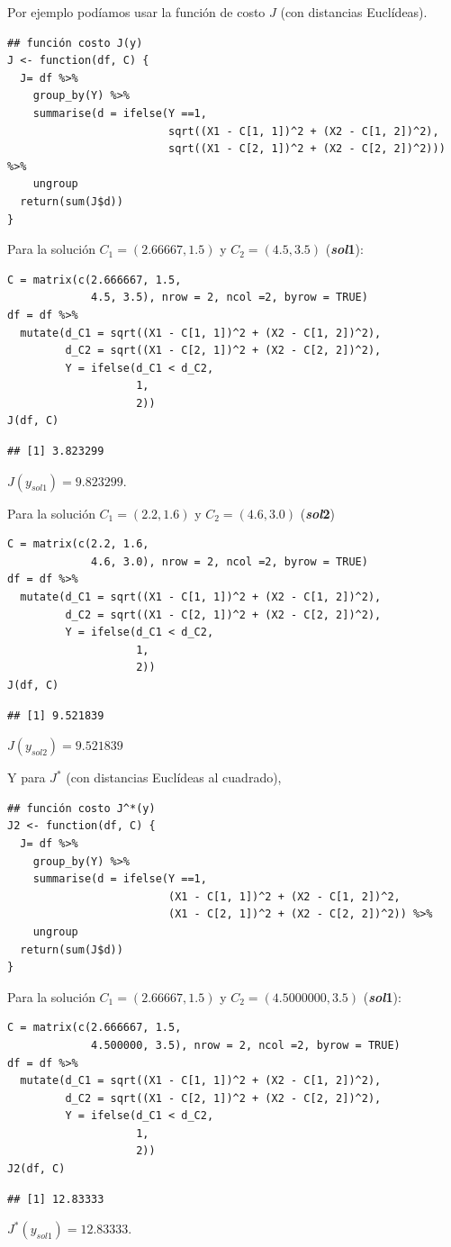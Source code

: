 Por ejemplo podíamos usar la función de costo $J$ (con distancias Euclídeas).
\begin{lstlisting}
## función costo J(y)
J <- function(df, C) {
  J= df %>%
    group_by(Y) %>%
    summarise(d = ifelse(Y ==1, 
                         sqrt((X1 - C[1, 1])^2 + (X2 - C[1, 2])^2),
                         sqrt((X1 - C[2, 1])^2 + (X2 - C[2, 2])^2))) %>%
    ungroup
  return(sum(J$d))
}
\end{lstlisting}
Para la solución $C_1=(2.66667,1.5)$ y $C_2=(4.5,3.5)$ (\textbf{\textit{sol}1}):
\begin{lstlisting}
C = matrix(c(2.666667, 1.5,
             4.5, 3.5), nrow = 2, ncol =2, byrow = TRUE)
df = df %>%
  mutate(d_C1 = sqrt((X1 - C[1, 1])^2 + (X2 - C[1, 2])^2),
         d_C2 = sqrt((X1 - C[2, 1])^2 + (X2 - C[2, 2])^2),
         Y = ifelse(d_C1 < d_C2,
                    1,
                    2))
J(df, C)
\end{lstlisting}
\begin{verbatim}
## [1] 3.823299
\end{verbatim}
$J(y_{sol1})=9.823299$.

Para la solución $C_1=(2.2,1.6)$ y $C_2=(4.6,3.0)$ (\textbf{\textit{sol}2})
\begin{lstlisting}
C = matrix(c(2.2, 1.6,
             4.6, 3.0), nrow = 2, ncol =2, byrow = TRUE)
df = df %>%
  mutate(d_C1 = sqrt((X1 - C[1, 1])^2 + (X2 - C[1, 2])^2),
         d_C2 = sqrt((X1 - C[2, 1])^2 + (X2 - C[2, 2])^2),
         Y = ifelse(d_C1 < d_C2,
                    1,
                    2))
J(df, C)
\end{lstlisting}
\begin{verbatim}
## [1] 9.521839
\end{verbatim}
$J(y_{sol2})=9.521839$

Y para $J^*$ (con distancias Euclídeas al cuadrado), 
\begin{lstlisting}
## función costo J^*(y)
J2 <- function(df, C) {
  J= df %>%
    group_by(Y) %>%
    summarise(d = ifelse(Y ==1, 
                         (X1 - C[1, 1])^2 + (X2 - C[1, 2])^2,
                         (X1 - C[2, 1])^2 + (X2 - C[2, 2])^2)) %>%
    ungroup
  return(sum(J$d))
}
\end{lstlisting}

Para la solución $C_1=(2.66667,1.5)$ y $C_2=(4.5000000,3.5)$ (\textbf{\textit{sol}1}):

\begin{lstlisting}
C = matrix(c(2.666667, 1.5,
             4.500000, 3.5), nrow = 2, ncol =2, byrow = TRUE)
df = df %>%
  mutate(d_C1 = sqrt((X1 - C[1, 1])^2 + (X2 - C[1, 2])^2),
         d_C2 = sqrt((X1 - C[2, 1])^2 + (X2 - C[2, 2])^2),
         Y = ifelse(d_C1 < d_C2,
                    1,
                    2))
J2(df, C)
\end{lstlisting}
\begin{verbatim}
## [1] 12.83333
\end{verbatim}
$J^*(y_{sol1})=12.83333$.

